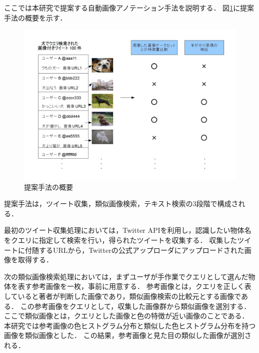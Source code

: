 \documentclass{deimj}
\begin{document}
ここでは本研究で提案する自動画像アノテーション手法を説明する．
図\ref{fig:way}に提案手法の概要を示す．
%
\begin{figure}[tb]
 \begin{center}
  \includegraphics[scale=0.29]{way.jpg}
 \end{center}
 \caption{提案手法の概要}
 \label{fig:way}
\end{figure}
%
提案手法は，ツイート収集，類似画像検索，テキスト検索の3段階で構成される．



最初のツイート収集処理においては，Twitter APIを利用し，認識したい物体名をクエリに指定して検索を行い，得られたツイートを収集する．
収集したツイートに付随するURLから，Twitterの公式アップローダにアップロードされた画像を取得する．

次の類似画像検索処理においては，まずユーザが手作業でクエリとして選んだ物体を表す参考画像を一枚，事前に用意する．
参考画像とは，クエリを正しく表していると著者が判断した画像であり，類似画像検索の比較元とする画像である．
この参考画像をクエリとして，収集した画像群から類似画像を選別する．
ここで類似画像とは，クエリとした画像と色の特徴が近い画像のことである．
本研究では参考画像の色ヒストグラム分布と類似した色ヒストグラム分布を持つ画像を類似画像とした．
この結果，参考画像と見た目の類似した画像が選別される．
\end{document}
